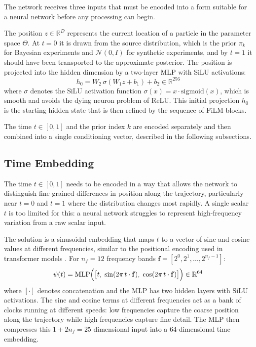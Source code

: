 The network receives three inputs that 
must be encoded into a form suitable for 
a neural network before any processing 
can begin.

The position $z \in \mathbb{R}^D$ 
represents the current location of a 
particle in the parameter space $\Theta$. 
At $t = 0$ it is drawn from the source 
distribution, which is the prior $\pi_k$ 
for Bayesian experiments and 
$\mathcal{N}(0, I)$ for synthetic 
experiments, and by $t = 1$ it should 
have been transported to the approximate 
posterior. The position is projected into 
the hidden dimension by a two-layer MLP 
with SiLU activations:
\begin{equation}
    h_0 = W_2\,\sigma(W_1 z + b_1) + b_2 
    \in \mathbb{R}^{256}
\end{equation}
where $\sigma$ denotes the SiLU activation 
function $\sigma(x) = x \cdot \text{sigmoid}(x)$, 
which is smooth and avoids the dying 
neuron problem of ReLU. This initial 
projection $h_0$ is the starting hidden 
state that is then refined by the 
sequence of FiLM blocks.

The time $t \in [0,1]$ and the prior 
index $k$ are encoded separately and 
then combined into a single conditioning 
vector, described in the following 
subsections.

\subsection{Time Embedding}

The time $t \in [0,1]$ needs to be 
encoded in a way that allows the network 
to distinguish fine-grained differences 
in position along the trajectory, 
particularly near $t = 0$ and $t = 1$ 
where the distribution changes most 
rapidly. A single scalar $t$ is too 
limited for this: a neural network 
struggles to represent high-frequency 
variation from a raw scalar input.

The solution is a sinusoidal embedding 
that maps $t$ to a vector of sine and 
cosine values at different frequencies, 
similar to the positional encoding used 
in transformer models \citep{vaswani2017}. For $n_f = 12$ frequency bands 
$\mathbf{f} = [2^0, 2^1, \ldots, 
2^{n_f - 1}]$:
\begin{equation}
    \psi(t) = \mathrm{MLP}\Bigl(
    \bigl[t,\; 
    \sin(2\pi\, t \cdot \mathbf{f}),\; 
    \cos(2\pi\, t \cdot \mathbf{f})
    \bigr]\Bigr) \in \mathbb{R}^{64}
\end{equation}
where $[\cdot]$ denotes concatenation 
and the MLP has two hidden layers with 
SiLU activations. The sine and cosine 
terms at different frequencies act as 
a bank of clocks running at different 
speeds: low frequencies capture the 
coarse position along the trajectory 
while high frequencies capture fine 
detail. The MLP then compresses this 
$1 + 2n_f = 25$ dimensional input into 
a 64-dimensional time embedding.

